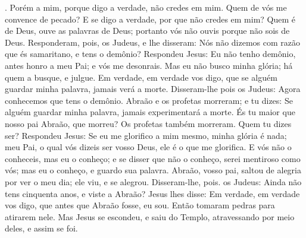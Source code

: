 {{} .
  Porém a mim, porque
{} digo a verdade, não credes em mim.
  Quem de vós me convence de pecado? E se digo a verdade, por que não credes em mim?
  Quem é de Deus, ouve as palavras de Deus; portanto vós não
{} ouvis porque não sois de Deus.
  Responderam, pois, os Judeus, e lhe disseram: Nós não dizemos com razão que és samaritano, e tens o demônio?
  Respondeu Jesus: Eu não tenho demônio, antes honro a meu Pai; e vós me desonrais.
  Mas eu não busco minha glória; há quem a busque, e julgue.
  Em verdade, em verdade vos digo, que se alguém guardar minha palavra, jamais verá a morte.
  Disseram-lhe pois os Judeus: Agora conhecemos que tens o demônio. Abraão e os profetas morreram; e tu dizes: Se alguém guardar minha palavra, jamais experimentará a morte.
  És tu maior que nosso pai Abraão, que morreu? Os profetas também morreram. Quem tu dizes ser?
  Respondeu Jesus: Se eu me glorifico a mim mesmo, minha glória é nada; meu Pai, o qual vós dizeis ser vosso Deus, ele é o que me glorifica.
  E vós não o conheceis, mas eu o conheço; e se disser que não o conheço, serei mentiroso como vós; mas eu o conheço, e guardo sua palavra.
  Abraão, vosso pai, saltou de alegria por ver o meu dia; ele viu, e se alegrou.
  Disseram-lhe, pois. os Judeus: Ainda não tens cinquenta anos, e viste a Abraão?
  Jesus lhes disse: Em verdade, em verdade vos digo, que antes que Abraão fosse, eu sou.
  Então tomaram pedras para atirarem nele. Mas Jesus se escondeu, e saiu do Templo, atravessando por meio deles, e assim se foi.
\par }

